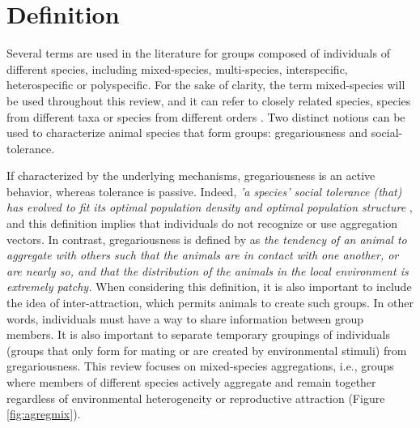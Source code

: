 	\section{Definition}
Several terms are used in the literature for groups composed of individuals of different species, including mixed-species, multi-species, interspecific, heterospecific or polyspecific. For the sake of clarity, the term mixed-species will be used throughout this review, and it can refer to closely related species, species from different taxa or species from different orders \cite{stensland_mixed_2003}. Two distinct notions can be used to characterize animal species that form groups: gregariousness and social-tolerance.

If characterized by the underlying mechanisms, gregariousness is an active behavior, whereas tolerance is passive. Indeed, \textit{'a species' social tolerance (that) has evolved to fit its optimal population density and optimal population structure} \cite{barrows_animal_2011}, and this definition implies that individuals do not recognize or use aggregation vectors. In contrast, gregariousness is defined by \citet{vulinec_collective_1990} as \textit{the tendency of an animal to aggregate with others such that the animals are in contact with one another, or are nearly so, and that the distribution of the animals in the local environment is extremely patchy.} When considering this definition, it is also important to include the idea of inter-attraction, which permits animals to create such groups. In other words, individuals must have a way to share information between group members. It is also important to separate temporary groupings of individuals (groups that only form for mating or are created by environmental stimuli) from gregariousness. This review focuses on mixed-species aggregations, i.e., groups where members of different species actively aggregate and remain together regardless of environmental heterogeneity or reproductive attraction (Figure \ref{fig:agregmix}).

